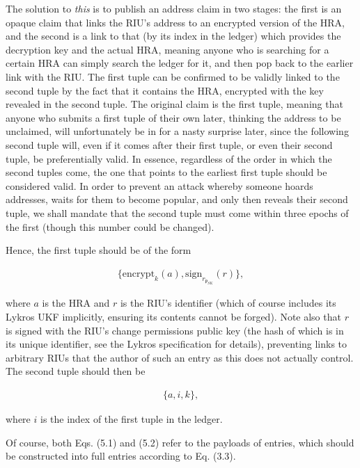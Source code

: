 \documentclass{extreport}
\begin{document}
The solution to \emph{this} is to publish an address claim in two stages: the first is an opaque claim that links the RIU's address to an encrypted version of the HRA, and the second is a link to that (by its index in the ledger) which provides the decryption key and the actual HRA, meaning anyone who is searching for a certain HRA can simply search the ledger for it, and then pop back to the earlier link with the RIU. The first tuple can be confirmed to be validly linked to the second tuple by the fact that it contains the HRA, encrypted with the key revealed in the second tuple. The original claim is the first tuple, meaning that anyone who submits a first tuple of their own later, thinking the address to be unclaimed, will unfortunately be in for a nasty surprise later, since the following second tuple will, even if it comes after their first tuple, or even their second tuple, be preferentially valid. In essence, regardless of the order in which the second tuples come, the one that points to the earliest first tuple should be considered valid. In order to prevent an attack whereby someone hoards addresses, waits for them to become popular, and only then reveals their second tuple, we shall mandate that the second tuple must come within three epochs of the first (though this number could be changed).

Hence, the first tuple should be of the form

\begin{align*}
\{ \mathrm{encrypt}_k(a), \mathrm{sign}_{r_{\mathfrak{p}_{SK}}}(r) \}, \tag{5.1}
\end{align*}

where \(a\) is the HRA and \(r\) is the RIU's identifier (which of course includes its Lykros UKF implicitly, ensuring its contents cannot be forged). Note also that \(r\) is signed with the RIU's change permissions public key (the hash of which is in its unique identifier, see the Lykros specification for details), preventing links to arbitrary RIUs that the author of such an entry as this does not actually control. The second tuple should then be

\begin{align*}
\{ a, i, k \}, \tag{5.2}
\end{align*}

where \(i\) is the index of the first tuple in the ledger.

Of course, both Eqs. (5.1) and (5.2) refer to the payloads of entries, which should be constructed into full entries according to Eq. (3.3).
\end{document}
